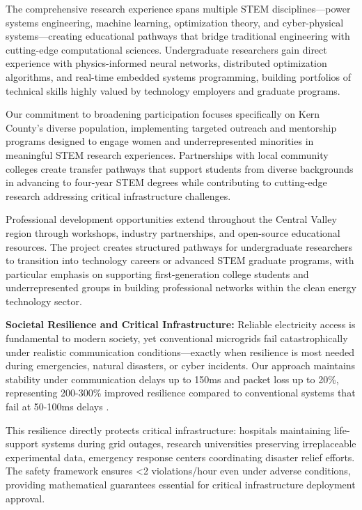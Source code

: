 \documentclass[12pt]{article}
\begin{document}
The comprehensive research experience spans multiple STEM disciplines—power systems engineering, machine learning, optimization theory, and cyber-physical systems—creating educational pathways that bridge traditional engineering with cutting-edge computational sciences. Undergraduate researchers gain direct experience with physics-informed neural networks, distributed optimization algorithms, and real-time embedded systems programming, building portfolios of technical skills highly valued by technology employers and graduate programs.

Our commitment to broadening participation focuses specifically on Kern County's diverse population, implementing targeted outreach and mentorship programs designed to engage women and underrepresented minorities in meaningful STEM research experiences. Partnerships with local community colleges create transfer pathways that support students from diverse backgrounds in advancing to four-year STEM degrees while contributing to cutting-edge research addressing critical infrastructure challenges.

Professional development opportunities extend throughout the Central Valley region through workshops, industry partnerships, and open-source educational resources. The project creates structured pathways for undergraduate researchers to transition into technology careers or advanced STEM graduate programs, with particular emphasis on supporting first-generation college students and underrepresented groups in building professional networks within the clean energy technology sector.

\textbf{Societal Resilience and Critical Infrastructure:} Reliable electricity access is fundamental to modern society, yet conventional microgrids fail catastrophically under realistic communication conditions—exactly when resilience is most needed during emergencies, natural disasters, or cyber incidents. Our approach maintains stability under communication delays up to 150ms and packet loss up to 20\%, representing 200-300\% improved resilience compared to conventional systems that fail at 50-100ms delays \cite{baseline2023delay}.

This resilience directly protects critical infrastructure: hospitals maintaining life-support systems during grid outages, research universities preserving irreplaceable experimental data, emergency response centers coordinating disaster relief efforts. The safety framework ensures <2 violations/hour even under adverse conditions, providing mathematical guarantees essential for critical infrastructure deployment approval.
\end{document}
